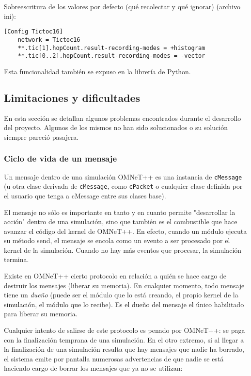 \documentclass[]{article}
\begin{document}
Sobreescritura de los valores por defecto (qué recolectar y qué ignorar)
(archivo ini):

\begin{verbatim}
[Config Tictoc16]
    network = Tictoc16
    **.tic[1].hopCount.result-recording-modes = +histogram
    **.tic[0..2].hopCount.result-recording-modes = -vector
\end{verbatim}

Esta funcionalidad también se expuso en la librería de Python.

\subsection{Limitaciones y dificultades}

En esta sección se detallan algunos problemas encontrados durante el desarrollo
del proyecto. Algunos de los mismos no han sido solucionados o su solución
siempre pareció pasajera.

\subsubsection{Ciclo de vida de un mensaje}

Un mensaje dentro de una simulación OMNeT++ es una instancia de \verb!cMessage!
(u otra clase derivada de \verb!cMessage!, como \verb!cPacket! o cualquier
clase definida por el usuario que tenga a cMessage entre sus clases base).

El mensaje no sólo es importante en tanto y en cuanto permite "desarrollar la
acción" dentro de una simulación, sino que también es el combustible que hace
avanzar el código del kernel de OMNeT++. En efecto, cuando un módulo ejecuta su
método send, el mensaje se encola como un evento a ser procesado por el kernel
de la simulación. Cuando no hay más eventos que procesar, la simulación
termina.

Existe en OMNeT++ cierto protocolo en relación a quién se hace cargo de
destruir los mensajes (liberar su memoria). En cualquier momento, todo mensaje
tiene un \textit{dueño} (puede ser el módulo que lo está creando, el propio
kernel de la simulación, el módulo que lo recibe). Es el dueño del mensaje el
único habilitado para liberar su memoria.

Cualquier intento de salirse de este protocolo es penado por OMNeT++: se paga
con la finalización temprana de una simulación. En el otro extremo, si al
llegar a la finalización de una simulación resulta que hay mensajes que nadie
ha borrado, el sistema emite por pantalla numerosas advertencias de que nadie
se está haciendo cargo de borrar los mensajes que ya no se utilizan:
\end{document}
